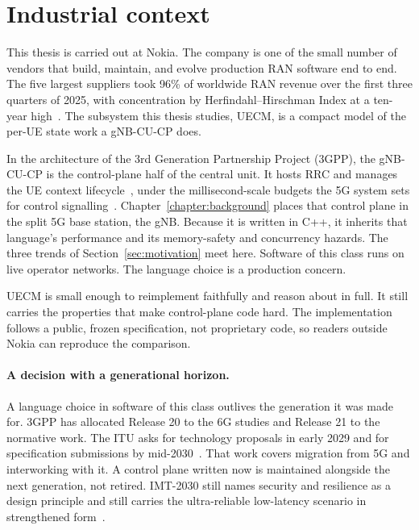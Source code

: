 \documentclass[english,oneside,a4paper,censored,csm,software-track-2020]{HYthesisML}
\begin{document}
\section{Industrial context}\label{sec:industrial}
This thesis is carried out at Nokia. The company is one of the small number of vendors
that build, maintain, and evolve production RAN software end to end. The five largest
suppliers took 96\% of worldwide RAN revenue over the first three quarters of 2025, with
concentration by Herfindahl--Hirschman Index at a ten-year
high~\cite{delloro2025ran3q,delloro2026ran}. The subsystem this thesis studies, UECM, is a compact model of the per-UE state work a
gNB-CU-CP does.

In the architecture of the 3rd Generation Partnership Project (3GPP), the gNB-CU-CP is
the control-plane half of the central unit. It hosts RRC and manages the UE context
lifecycle~\cite{3gpp38401,3gpp38331}, under the millisecond-scale budgets the 5G system
sets for control signalling~\cite{3gpp38913}. Chapter~\ref{chapter:background} places that
control plane in the split 5G base station, the gNB. Because it is written in C++, it inherits that language's
performance and its memory-safety and concurrency hazards. The three trends of
Section~\ref{sec:motivation} meet here. Software of this class runs on live operator
networks. The language choice is a production concern.

UECM is small enough to reimplement faithfully and reason about in full. It still
carries the properties that make control-plane code hard. The implementation follows a
public, frozen specification, not proprietary code, so readers outside Nokia can
reproduce the comparison.

\paragraph{A decision with a generational horizon.}
A language choice in software of this class outlives the generation it was made for.
3GPP has allocated Release 20 to the 6G studies and Release 21 to the normative work.
The ITU asks for technology proposals in early 2029 and for specification submissions by
mid-2030~\cite{3gpp2024road6g}. That work covers migration from 5G and interworking
with it. A control plane written now is maintained alongside the next generation, not
retired. IMT-2030 still names security and resilience as a design principle and still
carries the ultra-reliable low-latency scenario in strengthened
form~\cite{itu2023imt2030}.
\end{document}
